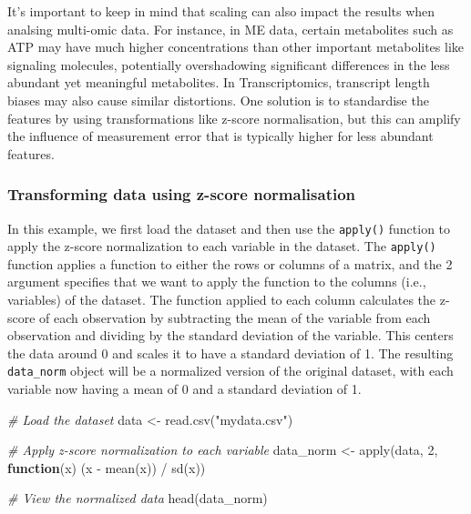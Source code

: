 \documentclass[
]{book}
\newenvironment{Shaded}{\begin{snugshade}}{\end{snugshade}}
\newcommand{\CommentTok}[1]{\textcolor[rgb]{0.56,0.35,0.01}{\textit{#1}}}
\newcommand{\ControlFlowTok}[1]{\textcolor[rgb]{0.13,0.29,0.53}{\textbf{#1}}}
\newcommand{\DecValTok}[1]{\textcolor[rgb]{0.00,0.00,0.81}{#1}}
\newcommand{\FunctionTok}[1]{\textcolor[rgb]{0.00,0.00,0.00}{#1}}
\newcommand{\NormalTok}[1]{#1}
\newcommand{\OtherTok}[1]{\textcolor[rgb]{0.56,0.35,0.01}{#1}}
\newcommand{\SpecialCharTok}[1]{\textcolor[rgb]{0.00,0.00,0.00}{#1}}
\newcommand{\StringTok}[1]{\textcolor[rgb]{0.31,0.60,0.02}{#1}}
\begin{document}
It's important to keep in mind that scaling can also impact the results when analsing multi-omic data. For instance, in ME data, certain metabolites such as ATP may have much higher concentrations than other important metabolites like signaling molecules, potentially overshadowing significant differences in the less abundant yet meaningful metabolites. In Transcriptomics, transcript length biases may also cause similar distortions. One solution is to standardise the features by using transformations like z-score normalisation, but this can amplify the influence of measurement error that is typically higher for less abundant features.

\hypertarget{transforming-data-using-z-score-normalisation}{%
\subsubsection*{Transforming data using z-score normalisation}\label{transforming-data-using-z-score-normalisation}}

In this example, we first load the dataset and then use the \texttt{apply()} function to apply the z-score normalization to each variable in the dataset. The \texttt{apply()} function applies a function to either the rows or columns of a matrix, and the 2 argument specifies that we want to apply the function to the columns (i.e., variables) of the dataset. The function applied to each column calculates the z-score of each observation by subtracting the mean of the variable from each observation and dividing by the standard deviation of the variable. This centers the data around 0 and scales it to have a standard deviation of 1. The resulting \texttt{data\_norm} object will be a normalized version of the original dataset, with each variable now having a mean of 0 and a standard deviation of 1.

\small

\begin{Shaded}
\begin{Highlighting}[]
\CommentTok{\# Load the dataset}
\NormalTok{data }\OtherTok{\textless{}{-}} \FunctionTok{read.csv}\NormalTok{(}\StringTok{"mydata.csv"}\NormalTok{)}

\CommentTok{\# Apply z{-}score normalization to each variable}
\NormalTok{data\_norm }\OtherTok{\textless{}{-}} \FunctionTok{apply}\NormalTok{(data, }\DecValTok{2}\NormalTok{, }\ControlFlowTok{function}\NormalTok{(x) (x }\SpecialCharTok{{-}} \FunctionTok{mean}\NormalTok{(x)) }\SpecialCharTok{/} \FunctionTok{sd}\NormalTok{(x))}

\CommentTok{\# View the normalized data}
\FunctionTok{head}\NormalTok{(data\_norm)}
\end{Highlighting}
\end{Shaded}
\end{document}
